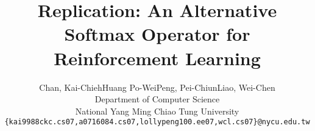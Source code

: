 \documentclass{article}
\title{Replication: An Alternative Softmax Operator for Reinforcement Learning}
\author{%
  Chan, Kai-Chieh\quad Huang Po-Wei\quad Peng, Pei-Chiun\quad Liao, Wei-Chen\\
  Department of Computer Science\\
  National Yang Ming Chiao Tung University\\
  \texttt{\{kai9988ckc.cs07,a0716084.cs07,lollypeng100.ee07,wcl.cs07\}@nycu.edu.tw}
}
\begin{document}
\maketitle














{
\small


}
\end{document}
